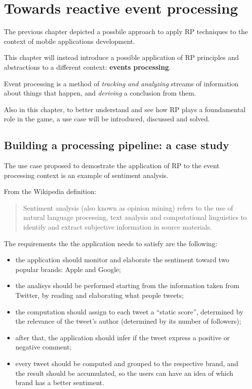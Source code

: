 \chapter{Towards reactive event
processing}\label{towards-reactive-event-processing}

The previous chapter depicted a possbile approach to apply RP techniques
to the context of mobile applications development.

This chapter will instead introduce a possible application of RP
principles and abstractions to a different context: \textbf{events
processing}.

Event processing is a method of \emph{tracking and analyzing} streams of
information about things that happen, and \emph{deriving} a conclusion
from them.

Also in this chapter, to better understand and see how RP plays a
foundamental role in the game, a use case will be introduced, discussed
and solved.

\section{Building a processing pipeline: a case
study}\label{building-a-processing-pipeline-a-case-study}

The use case proposed to demostrate the application of RP to the event
processing context is an example of sentiment analysis.

From the Wikipedia definition:

\begin{quote}
Sentiment analysis (also known as opinion mining) refers to the use of
natural language processing, text analysis and computational linguistics
to identify and extract subjective information in source materials.
\end{quote}

The requirements the the application needs to satisfy are the following:

\begin{itemize}
\itemsep1pt\parskip0pt
\item
  the application should monitor and elaborate the sentiment toward two
  popular brands: Apple and Google;
\item
  the analisys should be performed starting from the information taken
  from Twitter, by reading and elaborating what people tweets;
\item
  the computation should assign to each tweet a ``static score'',
  determined by the relevance of the tweet's author (determined by its
  number of followers);
\item
  after that, the application should infer if the tweet express a
  positive or negative comment;
\item
  every tweet should be computed and grouped to the respective brand,
  and the result should be accumulated, so the users can have an idea of
  which brand has a better sentiment.
\end{itemize}


